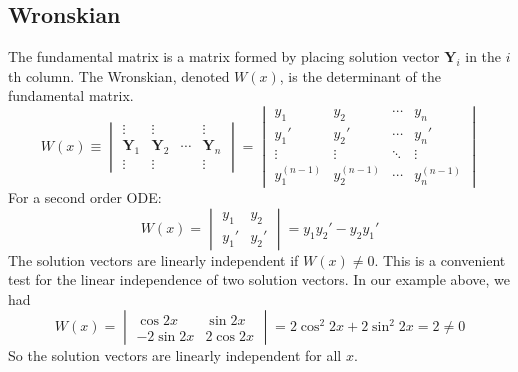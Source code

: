 \documentclass{article}
\begin{document}
\subsection{Wronskian}
The fundamental matrix is a matrix formed by placing solution vector $\bm Y_i$ in the $i$th column. The Wronskian, denoted $W(x)$, is the determinant of the fundamental matrix.
\[
	W(x) \equiv \begin{vmatrix}
		\vdots  & \vdots  &        & \vdots  \\
		\bm Y_1 & \bm Y_2 & \cdots & \bm Y_n \\
		\vdots  & \vdots  &        & \vdots
	\end{vmatrix} = \begin{vmatrix}
		y_1         & y_2         & \cdots & y_n         \\
		y_1'        & y_2'        & \cdots & y_n'        \\
		\vdots      & \vdots      & \ddots & \vdots      \\
		y_1^{(n-1)} & y_2^{(n-1)} & \cdots & y_n^{(n-1)}
	\end{vmatrix}
\]
For a second order ODE:
\begin{equation}\label{wronskian2}
	W(x) = \begin{vmatrix}
		y_1 & y_2 \\ y_1' & y_2'
	\end{vmatrix}
	= y_1y_2' - y_2y_1'
\end{equation}
The solution vectors are linearly independent if $W(x) \neq 0$. This is a convenient test for the linear independence of two solution vectors. In our example above, we had
\[
	W(x) = \begin{vmatrix}
		\cos 2x   & \sin 2x  \\
		-2\sin 2x & 2\cos 2x
	\end{vmatrix}
	= 2\cos^2 2x + 2\sin^2 2x = 2 \neq 0
\]
So the solution vectors are linearly independent for all $x$.
\end{document}

